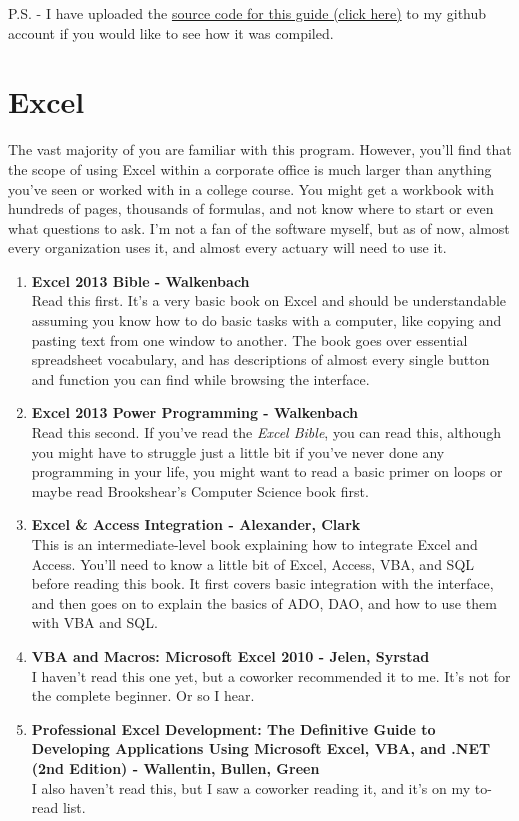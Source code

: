 \documentclass[oneside, titlepage]{article}
\begin{document}
P.S. - I have uploaded the \href{https://github.com/colonelsmoothie/reading_act/blob/master/tex/reading_act.tex}{source code for this guide (click here)} to my github account if you would like to see how it was compiled.

\newpage

\section{Excel}
The vast majority of you are familiar with this program. However, you'll find that the scope of using Excel within a corporate office is much larger than anything you've seen or worked with in a college course. You might get a workbook with hundreds of pages, thousands of formulas, and not know where to start or even what questions to ask. I'm not a fan of the software myself, but as of now, almost every organization uses it, and almost every actuary will need to use it.

\begin{enumerate}
\item{\bfseries Excel 2013 Bible - Walkenbach}\\
Read this first. It's a very basic book on Excel and should be understandable assuming you know how to do basic tasks with a computer, like copying and pasting text from one window to another. The book goes over essential spreadsheet vocabulary, and has descriptions of almost every single button and function you can find while browsing the interface.

\item{\bfseries Excel 2013 Power Programming - Walkenbach}\\
Read this second. If you've read the {\itshape Excel Bible}, you can read this, although you might have to struggle just a little bit if you've never done any programming in your life, you might want to read a basic primer on loops or maybe read Brookshear's Computer Science book first.

\item{\bfseries Excel \& Access Integration - Alexander, Clark}\\
This is an intermediate-level book explaining how to integrate Excel and Access. You'll need to know a little bit of Excel, Access, VBA, and SQL before reading this book. It first covers basic integration with the interface, and then goes on to explain the basics of ADO, DAO, and how to use them with VBA and SQL.

\item{\bfseries VBA and Macros: Microsoft Excel 2010 - Jelen, Syrstad}\\
I haven't read this one yet, but a coworker recommended it to me. It's not for the complete beginner. Or so I hear.

\item{\bfseries Professional Excel Development: The Definitive Guide to Developing Applications Using Microsoft Excel, VBA, and .NET (2nd Edition) - Wallentin, Bullen, Green}\\
I also haven't read this, but I saw a coworker reading it, and it's on my to-read list.
\end{enumerate}
\end{document}
